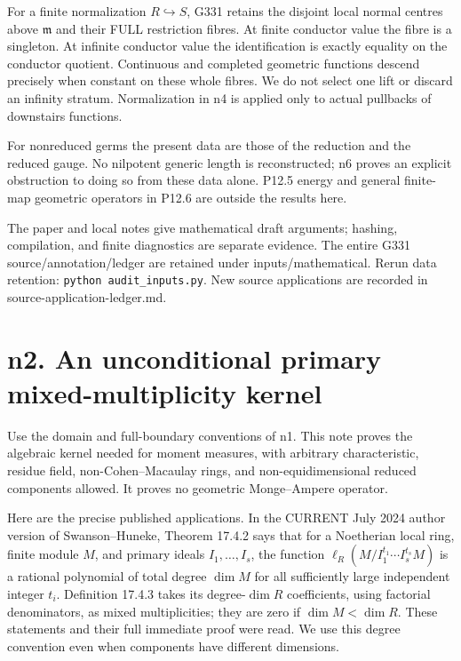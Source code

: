 \documentclass[
  11pt,
]{article}
\begin{document}
For a finite normalization \(R\hookrightarrow S\), G331 retains the
disjoint local normal centres above \(\mathfrak m\) and their FULL
restriction fibres. At finite conductor value the fibre is a singleton.
At infinite conductor value the identification is exactly equality on
the conductor quotient. Continuous and completed geometric functions
descend precisely when constant on these whole fibres. We do not select
one lift or discard an infinity stratum. Normalization in n4 is applied
only to actual pullbacks of downstairs functions.

For nonreduced germs the present data are those of the reduction and the
reduced gauge. No nilpotent generic length is reconstructed; n6 proves
an explicit obstruction to doing so from these data alone. P12.5 energy
and general finite-map geometric operators in P12.6 are outside the
results here.

The paper and local notes give mathematical draft arguments; hashing,
compilation, and finite diagnostics are separate evidence. The entire
G331 source/annotation/ledger are retained under inputs/mathematical.
Rerun data retention: \texttt{python\ audit\_inputs.py}. New source
applications are recorded in source-application-ledger.md.

\section{n2. An unconditional primary mixed-multiplicity
kernel}\label{n2.-an-unconditional-primary-mixed-multiplicity-kernel}

Use the domain and full-boundary conventions of n1. This note proves the
algebraic kernel needed for moment measures, with arbitrary
characteristic, residue field, non-Cohen--Macaulay rings, and
non-equidimensional reduced components allowed. It proves no geometric
Monge--Ampere operator.

Here are the precise published applications. In the CURRENT July 2024
author version of Swanson--Huneke, Theorem 17.4.2 says that for a
Noetherian local ring, finite module \(M\), and primary ideals
\(I_1,\ldots,I_s\), the function
\(\ell_R(M/I_1^{t_1}\cdots I_s^{t_s}M)\) is a rational polynomial of
total degree \(\dim M\) for all sufficiently large independent integer
\(t_i\). Definition 17.4.3 takes its degree-\(\dim R\) coefficients,
using factorial denominators, as mixed multiplicities; they are zero if
\(\dim M<\dim R\). These statements and their full immediate proof were
read. We use this degree convention even when components have different
dimensions.
\end{document}
